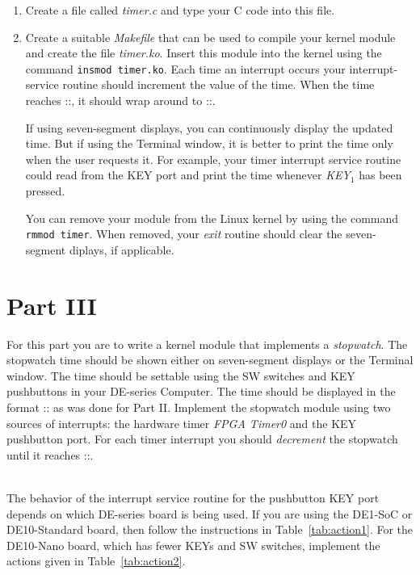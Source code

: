 \documentclass[epsfig,10pt,fullpage]{article}
\begin{document}
\begin{enumerate}
\item Create a file called {\it timer.c} and type your C code into this file.

\item
Create a suitable {\it Makefile} that can be used to compile your kernel module and create the 
file {\it timer.ko}. Insert this module into the kernel using the command \texttt{insmod timer.ko}.
Each time an interrupt occurs your interrupt-service routine should increment the value of the 
time. When the time reaches ::, it should wrap around to 
::. 

If using seven-segment displays, you can continuously display the updated time. But if
using the Terminal window, it is better to print the time only when the user requests it.
For example, your timer interrupt service routine could read from the KEY port and print the 
time whenever {\it KEY}$_1$ has been pressed.

You can remove your module from the Linux kernel by using the command 
\texttt{rmmod timer}. When removed, your {\it exit} routine should clear the seven-segment
diplays, if applicable.
\end{enumerate}

\section*{Part III}
\noindent
For this part you are to write a kernel module that implements a {\it stopwatch}. The stopwatch
time should be shown either on seven-segment displays or the Terminal window. The time should 
be settable using the SW switches and KEY pushbuttons in your DE-series Computer. The time 
should be displayed in the format :: as was done for Part II.
Implement the stopwatch module using two sources of interrupts: the hardware timer 
{\it FPGA Timer0} and the KEY pushbutton port. For each timer interrupt you should 
{\it decrement} the stopwatch until it reaches ::.

~\\
\noindent
The behavior of the interrupt service routine for the pushbutton KEY port depends on which
DE-series board is being used. If you are using the DE1-SoC or DE10-Standard board, then
follow the instructions in Table~\ref{tab:action1}. For the DE10-Nano board, which has
fewer KEYs and SW switches, implement the actions given in Table~\ref{tab:action2}.
\end{document}
